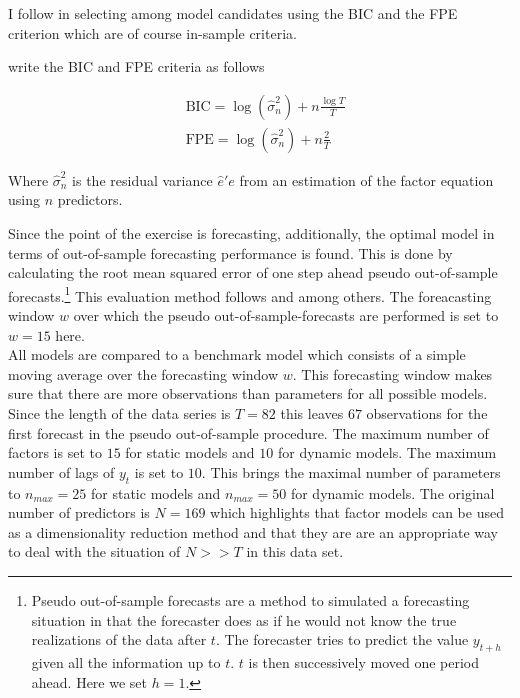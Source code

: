 \documentclass[12pt]{article}
\begin{document}
I follow \citet{bai2008forecasting} in selecting among model candidates using the BIC and the FPE criterion which are of course in-sample criteria. 

\citet{bai2008forecasting} write the BIC and FPE criteria as follows

\begin{equation}
\label{information criteria}
\begin{split}
	& \text{BIC} = \log(\hat \sigma_n^2) + n \frac{\log T}{T} \\ 
	& \text{FPE} = \log(\hat \sigma_n^2) + n \frac{2}{T}
\end{split}
\end{equation}

Where $\hat \sigma_n^2$ is the residual variance $\hat e'e$ from an estimation of the factor equation using $n$ predictors.

Since the point of the exercise is forecasting, additionally, the optimal model in terms of out-of-sample forecasting performance is found. This is done by calculating the root mean squared error of one step ahead pseudo out-of-sample forecasts.\footnote{Pseudo out-of-sample forecasts are a method to simulated a forecasting situation in that the forecaster does as if he would not know the true realizations of the data after $t$. The forecaster tries to predict the value $y_{t+h}$ given all the information up to $t$. $t$ is then successively moved one period ahead. Here we set $h=1$.} This evaluation method follows \citet{forni2005the} and \citet{bai2008forecasting} among others. The foreacasting window $w$ over which the pseudo out-of-sample-forecasts are performed is set to $w=15$ here. \\


All models are compared to a benchmark model which consists of a simple moving average over the forecasting window $w$. This forecasting window makes sure that there are more observations than parameters for all possible models. Since the length of the data series is $T=82$ this leaves $67$ observations for the first forecast in the pseudo out-of-sample procedure. The maximum number of factors is set to $15$ for static models and $10$ for dynamic models. The maximum number of lags of $y_t$ is set to $10$. This brings the maximal number of parameters to $n_{max} = 25$ for static models and $n_{max} = 50$ for dynamic models. The original number of predictors is $N = 169$ which highlights that factor models can be used as a dimensionality reduction method and that they are are an appropriate way to deal with the situation of $N>>T$ in this data set.
\end{document}
